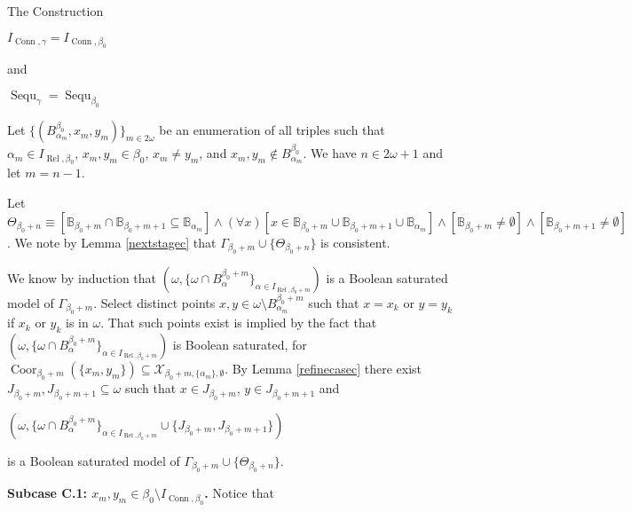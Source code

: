 \documentclass{amsart}
\theoremstyle{definition}\newtheorem{theorem}{Theorem}
\theoremstyle{definition}\newtheorem{bigtheorem}{Theorem}
\numberwithin{theorem}{section}
\theoremstyle{definition}\newtheorem{corollary}[theorem]{Corollary}
\theoremstyle{definition}\newtheorem{proposition}[theorem]{Proposition}
\theoremstyle{definition}\newtheorem{definition}[theorem]{Definition}
\theoremstyle{definition}\newtheorem{question}[theorem]{Question}
\theoremstyle{definition}\newtheorem{example}[theorem]{Example}
\theoremstyle{definition}\newtheorem{remark}[theorem]{Remark}
\theoremstyle{definition}\newtheorem{note}[theorem]{Note}
\theoremstyle{definition}\newtheorem{lemma}[theorem]{Lemma}
\theoremstyle{definition}\newtheorem{fact}[theorem]{Fact}
\theoremstyle{definition}\newtheorem{define}[theorem]{Definition}
\theoremstyle{definition}\newtheorem{definitions}[theorem]{Definitions}
\theoremstyle{definition}\newtheorem{claim}[theorem]{Claim}
\theoremstyle{definition}\newtheorem{obs}[theorem]{Observation}
\theoremstyle{definition}\newtheorem{construction}[theorem]{Construction}
\newcommand{\B}{\mathbb{B}}
\newcommand{\Rel}{\operatorname{Rel}}
\newcommand{\X}{\mathcal{X}}
\newcommand{\Coor}{\operatorname{Coor}}
\newcommand{\Conn}{\operatorname{Conn}}
\newcommand{\Sequ}{\operatorname{Sequ}}
\begin{document}
\begin{section}{The Construction}
\begin{center}
$I_{\Conn, \gamma} = I_{\Conn, \beta_0}$
\end{center}

\noindent and

\begin{center}
$\Sequ_{\gamma} = \Sequ_{\beta_0}$
\end{center}



Let $\{(B_{\alpha_m}^{\beta_0}, x_m, y_m)\}_{m \in 2\omega}$ be an enumeration of all triples such that $\alpha_m \in I_{\Rel, \beta_0}$, $x_m, y_m \in \beta_0$, $x_m \neq y_m$, and $x_m, y_m \notin B_{\alpha_m}^{\beta_0}$.  We have $n\in 2\omega + 1$ and let $m = n - 1$.

Let $\Theta_{\beta_0 + n}\equiv [\B_{\beta_0 + m} \cap \B_{\beta_0 + m + 1} \subseteq \B_{\alpha_m}] \wedge (\forall x)[x \in \B_{\beta_0 + m}\cup \B_{\beta_0 + m + 1}\cup \B_{\alpha_m}] \wedge [\B_{\beta_0 + m} \neq \emptyset] \wedge [\B_{\beta_0 + m + 1} \neq \emptyset]$.  We note by Lemma \ref{nextstagec} that $\Gamma_{\beta_0 + m} \cup \{\Theta_{\beta_0 + n}\}$ is consistent.

We know by induction that $(\omega, \{\omega \cap B_{\alpha}^{\beta_0 + m}\}_{\alpha \in I_{\Rel, \beta_0 + m}})$ is a Boolean saturated model of $\Gamma_{\beta_0 + m}$.  Select distinct points $x, y\in \omega \setminus B_{\alpha_m}^{\beta_0 + m}$ such that $x = x_k$ or $y = y_k$ if $x_k$ or $y_k$ is in $\omega$.  That such points exist is implied by the fact that $(\omega, \{\omega \cap B_{\alpha}^{\beta_0 + m}\}_{\alpha \in I_{\Rel, \beta_0 + m}})$ is Boolean saturated, for $\Coor_{\beta_0 + m}(\{x_m, y_m\}) \subseteq \X_{\beta_0 + m, \{\alpha_m\}, \emptyset}$.  By Lemma \ref{refinecasec} there exist $J_{\beta_0 + m}, J_{\beta_0 + m + 1} \subseteq \omega$ such that $x\in J_{\beta_0 + m}$, $y \in J_{\beta_0 + m + 1}$ and

\begin{center}

$(\omega, \{\omega \cap B_{\alpha}^{\beta_0 + m}\}_{\alpha \in I_{\Rel, \beta_0 + m}} \cup \{J_{\beta_0 + m}, J_{\beta_0 + m + 1}\})$

\end{center}

\noindent is a Boolean saturated model of $\Gamma_{\beta_0 + m} \cup \{\Theta_{\beta_0 + n}\}$.


\noindent \textbf{Subcase C.1: $x_m, y_m \in \beta_0 \setminus I_{\Conn, \beta_0}$.} Notice that 


\end{section}
\end{document}
